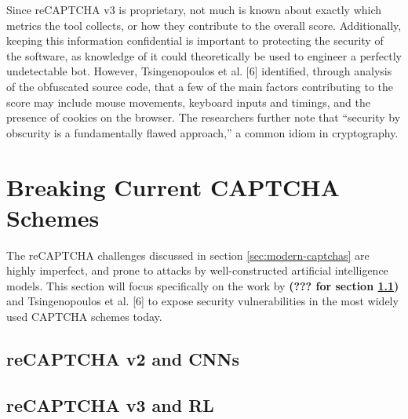 \documentclass[sigplan,screen,nonacm]{acmart-tagged}
\begin{document}
Since reCAPTCHA v3 is proprietary, not much is known about exactly which metrics the tool collects, or how they contribute to the overall score. Additionally, keeping this information confidential is important to protecting the security of the software, as knowledge of it could theoretically be used to engineer a perfectly undetectable bot. However, Tsingenopoulos et al. [6] identified, through analysis of the obfuscated source code, that a few of the main factors contributing to the score may include mouse movements, keyboard inputs and timings, and the presence of cookies on the browser. The researchers further note that ``security by obscurity is a fundamentally flawed approach,'' a common idiom in cryptography.


\section{Breaking Current CAPTCHA Schemes}
\label{sec:breaking}

The reCAPTCHA challenges discussed in section \ref{sec:modern-captchas} are highly imperfect, and prone to attacks by well-constructed artificial intelligence models. This section will focus specifically on the work by \textbf{(??? for section \ref{sec:v2})} and Tsingenopoulos et al. [6] to expose security vulnerabilities in the most widely used CAPTCHA schemes today.

\subsection{reCAPTCHA v2 and CNNs}
\label{sec:v2}


\subsection{reCAPTCHA v3 and RL}
\label{sec:v3}

\end{document}
